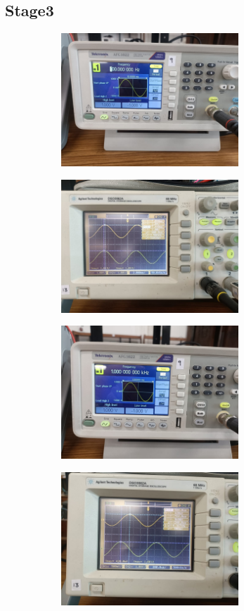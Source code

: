 \documentclass[a4paper,12pt]{article}
\begin{document}
\subsection*{Stage3}
\begin{figure}[H]
    \centering
    \begin{subfigure}{0.5\textwidth}
        \centering
        \includegraphics[height=5cm]{figs/Stage3/100/para.jpeg}
    \end{subfigure}%
    \begin{subfigure}{0.5\textwidth}
        \centering
        \includegraphics[height=5cm]{figs/Stage3/100/plot.jpeg}
    \end{subfigure}
\end{figure}
\begin{figure}[H]
    \centering
    \begin{subfigure}{0.5\textwidth}
        \centering
        \includegraphics[height=5cm]{figs/Stage3/1000/para.jpeg}
    \end{subfigure}%
    \begin{subfigure}{0.5\textwidth}
        \centering
        \includegraphics[height=5cm]{figs/Stage3/1000/plot.jpeg}
    \end{subfigure}
\end{figure}
\end{document}

